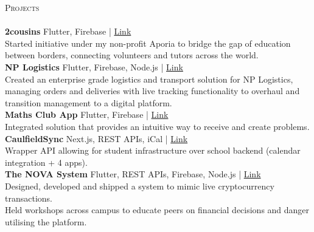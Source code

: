 \documentclass[a4paper]{article}
\newcommand{\lineunder} {
    \vspace*{-8pt} \\
    \hspace*{-18pt} \hrulefill \\
}
\newcommand{\header} [1] {
    {\hspace*{-18pt}\vspace*{6pt} \textsc{#1}}
    \vspace*{-6pt} \lineunder
}
\begin{document}
\header{Projects}
{\textbf{2cousins}} {\textsl{\hfill} Flutter, Firebase | \href{https://2cousins.org/}{\color{blue}Link}}\\
Started initiative under my non-profit Aporia to bridge the gap of education between borders, connecting volunteers and tutors across the world.\\
\vspace*{2mm}
{\textbf{NP Logistics}} {\textsl{\hfill} Flutter, Firebase, Node.js} | \href{https://nplogistics.com.au}{\color{blue}Link}\\
Created an enterprise grade logistics and transport solution for NP Logistics, managing orders and deliveries with live tracking functionality to overhaul and transition management to a digital platform.\\
\vspace*{2mm}
{\textbf{Maths Club App}} {\textsl{\hfill} Flutter, Firebase} | \href{https://github.com/cgs-math/app}{\color{blue}Link}\\
Integrated solution that provides an intuitive way to receive and create problems.\\
\vspace*{2mm}
{\textbf{CaulfieldSync}} {\textsl{\hfill} Next.js, REST APIs, iCal} | \href{https://caulfieldsync.vercel.app/}{\color{blue}Link}\\
Wrapper API allowing for student infrastructure over school backend (calendar integration + 4 apps).\\
\vspace*{2mm}
{\textbf{The NOVA System}} {\textsl{\hfill} Flutter, REST APIs, Firebase, Node.js} | \href{https://the-nova-system.github.io/}{\color{blue}Link}\\
Designed, developed and shipped a system to mimic live cryptocurrency transactions.\\
Held workshops across campus to educate peers on financial decisions and danger utilising the platform.\\

\end{document}
